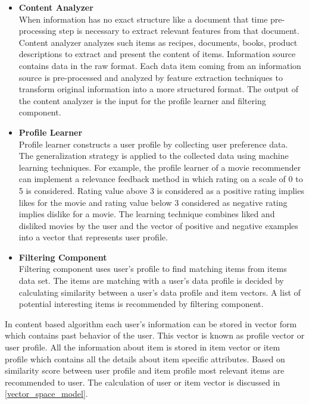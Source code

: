 \begin{itemize}
\item \textbf{Content Analyzer} 
\\
When information has no exact structure like a document that time pre-processing step is necessary to extract relevant features from that document. Content analyzer analyzes such items as recipes, documents, books, product descriptions to extract and present the content of items. Information source contains data in the raw format. Each data item coming from an information source is pre-processed and analyzed by feature extraction techniques to transform original information into a more structured format. The output of the content analyzer is the input for the profile learner and filtering component.

\item \textbf{Profile Learner} 
\\
Profile learner constructs a user profile by collecting user preference data. The generalization strategy is applied to the collected data using machine learning techniques. For example, the profile learner of a movie recommender can implement a relevance feedback method in which rating on a scale of 0 to 5 is considered. Rating value above 3 is considered as a positive rating implies likes for the movie and rating value below 3 considered as negative rating implies dislike for a movie. The learning technique combines liked and disliked movies by the user and the vector of positive and negative examples into a vector that represents user profile. 

\item \textbf{Filtering Component}
\\
Filtering component uses user's profile to find matching items from items data set. The items are matching with a user's data profile is decided by calculating similarity between a user's data profile and item vectors. A list of potential interesting items is recommended by filtering component. 
\end{itemize}
\noindent
In content based algorithm each user's information can be stored in vector form which contains past behavior of the user. This vector is known as profile vector or user profile. All the information about item is stored in item vector or item profile which contains all the details about item specific attributes. Based on similarity score between user profile and item profile most relevant items are recommended to user. The calculation of user or item vector is discussed in \autoref{vector_space_model}.

